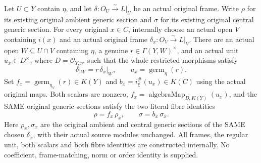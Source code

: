 \begin{theorem}
\label{thm:intrinsic-numerical-two-frame-original-coefficient-squares}
\leanok
{}
Let $U\subset Y$ contain $\eta$, and let
$\delta:O_U\xrightarrow{\sim}L|_U$ be an actual original frame.
Write $\rho$ for its existing original ambient generic section and
$\sigma$ for its existing original central generic section.
For every original $x\in C$, internally choose an actual open $V$ containing
$i(x)$ and an actual original frame
$\delta_x:O_V\xrightarrow{\sim}L|_V$. There are an actual open
$W\subseteq U\cap V$ containing $\eta$, a genuine
$r\in\Gamma(Y,W)^\times$, and an actual unit
$u_x\in D^\times$, where $D=\mathcal O_{Y,\eta}$, such that the whole
restricted morphisms satisfy
\[
 \delta|_W=r\,\delta_x|_W,\qquad
 u_x=\operatorname{germ}_{\eta}(r).
\]
Set $f_x=\operatorname{germ}_{\eta_Y}(r)\in K(Y)$ and
$b_x=i_\xi^\#(u_x)\in K(C)$ using the actual original maps. Both scalars
are nonzero, $f_x=\operatorname{algebraMap}_{D,K(Y)}(u_x)$, and the SAME
original generic sections satisfy the two literal fibre identities
\[
 \rho=f_x\,\rho_x,\qquad \sigma=b_x\,\sigma_x.
\]
Here $\rho_x,\sigma_x$ are the original ambient and central generic sections
of the SAME chosen $\delta_x$, with their actual source modules unchanged.
All frames, the regular unit, both scalars and both fibre identities are
constructed internally. No coefficient, frame-matching, norm or order
identity is supplied.
\end{theorem}

